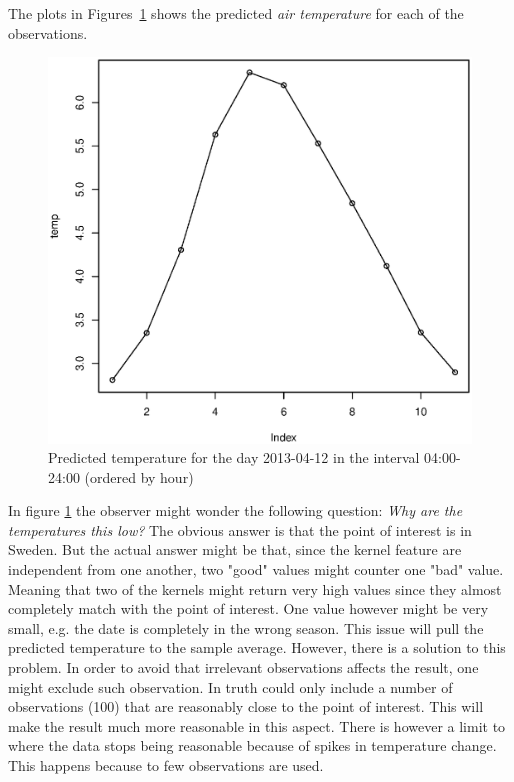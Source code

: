\documentclass[a4paper, twocolumn]{article}
\begin{document}
    The plots in Figures~\ref{fig:result} shows the predicted \textit{air temperature} for each of the observations. 
    \begin{figure}[!h]
    \centering
    \caption{Predicted temperature for the day 2013-04-12 in the interval 04:00-24:00 (ordered by hour)\label{fig:result}}
	    \begin{minipage}[]{0.4\textwidth}
	    	\includegraphics[width=\textwidth]{share/result.eps}
	    \end{minipage}
    \end{figure}

	In figure \ref{fig:result} the observer might wonder the  following question: \textit{Why are the temperatures this low?}\newline
    The obvious answer is that the point of interest is in Sweden. But the actual answer might be that, since the kernel feature are independent from one another, two "good" values might counter one "bad" value. Meaning that two of the kernels might return very high values since they almost completely match with the point of interest. One value however might be very small, e.g. the date is completely in the wrong season. This issue will pull the predicted temperature to the sample average. However, there is a solution to this problem. In order to avoid that irrelevant observations affects the result, one might exclude such observation. In truth could only include a number of observations (100) that are reasonably close to the point of interest. This will make the result much more reasonable in this aspect. There is however a limit to where the data stops being reasonable because of spikes in temperature change. This happens because to few observations are used.
\end{document}
